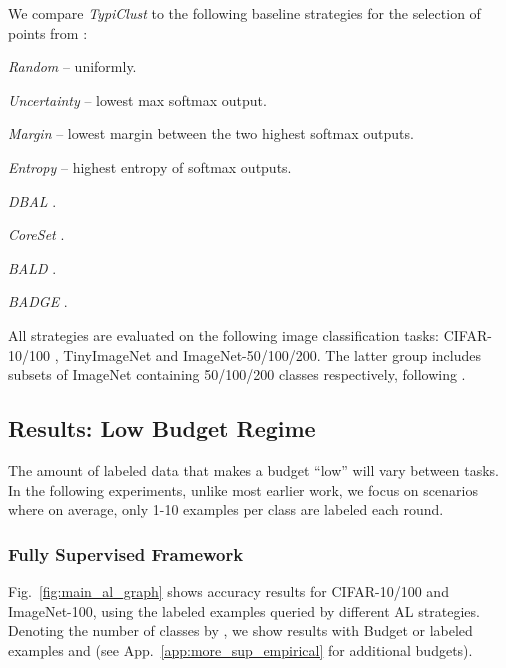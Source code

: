 \documentclass{article}
\newcommand{\app}{App.}
\begin{document}
We compare \emph{TypiClust} to the following baseline strategies for the selection of  points from : \begin{inparaenum}[(1)] \item \emph{Random} -- uniformly. \item \emph{Uncertainty} -- lowest max softmax output. \item \emph{Margin} -- lowest margin between the two highest softmax outputs. \item \emph{Entropy} --  highest entropy of softmax outputs. \item \emph{DBAL} \citep{gal2017deep}.
\item \emph{CoreSet} \citep{sener2018active}. \item \emph{BALD} \citep{kirsch2019batchbald}. \item \emph{BADGE} \citep{DBLP:conf/iclr/AshZK0A20}. \end{inparaenum} All strategies are evaluated on the following image classification tasks: CIFAR-10/100 \citep{krizhevsky2009learning}, TinyImageNet \citep{le2015tiny} and ImageNet-50/100/200. The latter group includes subsets of ImageNet \citep{deng2009imagenet} containing 50/100/200 classes respectively, following \citet{van2020scan}.



\subsection{Results: Low Budget Regime}
\label{sec:emp_results}
The amount of labeled data that makes a budget ``low'' will vary between tasks. In the following experiments, unlike most earlier work, we focus on scenarios where on average, only 1-10 examples per class are labeled each round.


\subsubsection{Fully Supervised Framework} 
\label{sec:fwork:(i)}

Fig.~\ref{fig:main_al_graph} shows accuracy results for CIFAR-10/100 and ImageNet-100, using the labeled examples queried by different AL strategies. Denoting the number of classes by , we show results with Budget  or  labeled examples and  (see \app~\ref{app:more_sup_empirical} for additional budgets).
\end{document}

